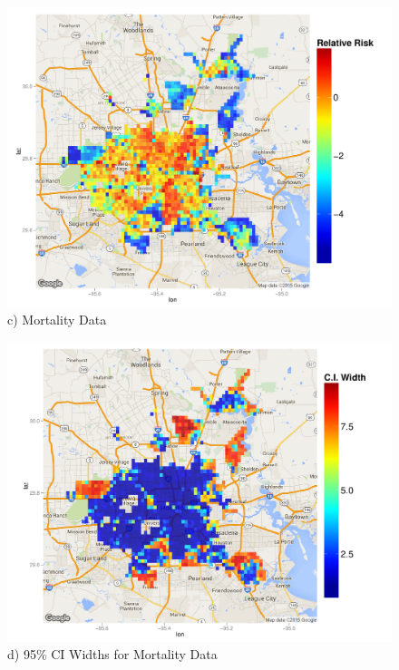 \documentclass[final]{statsoc}
\begin{document}
\begin{figure}
\begin{minipage}[t]{0.48\textwidth}
  \end{minipage}
  \begin{minipage}[t]{0.48\textwidth}
    \centering
    \includegraphics[width=1.0\textwidth]{./imgs/mortality_rr.pdf}
    c) Mortality Data
  \end{minipage}
  \hfill
    \begin{minipage}[t]{0.48\textwidth}
    \centering
    \includegraphics[width=1.0\textwidth]{imgs/mortality_ciwidths.pdf}
    d) 95\% CI Widths for Mortality Data
  \end{minipage}
  \begin{minipage}[t]{0.48\textwidth}

\end{minipage}
\end{figure}
\end{document}
